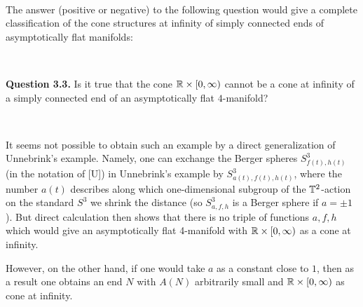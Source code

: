\ 

The answer (positive or negative) to the following question would give
a complete classification
of the cone structures at infinity of simply connected ends
of asymptotically flat manifolds:

\ 

\noindent
{\bf Question 3.3.} Is it true that the cone ${\Bbb R}\times [0,\infty)$ 
cannot be
a cone at infinity of a simply connected end of an
asymptotically flat $4$-manifold?

\ 

It seems not possible to obtain such an 
example by a direct generalization of Unnebrink's example. 
Namely, one can exchange 
the Berger spheres 
$S^3_{f(t),h(t)}$ (in the notation of [U]) 
in Unnebrink's example by $S^3_{a(t),f(t),h(t)}$, 
where the number $a(t)$ describes along which one-dimensional subgroup 
of the ${\Bbb T}^2$-action 
on the standard $S^3$ we shrink the distance 
(so $S^3_{a,f,h}$ is a Berger sphere if $a=\pm1$).
But direct calculation then shows that there is no triple of functions
$a,f,h$ which
would give an asymptotically flat 4-manifold with ${\Bbb R}\times [0,\infty)$
as a cone at infinity.

However, on the other hand, if one would take $a$ as a constant close to $1$, then
as a result one obtains an end $N$ with $A(N)$ arbitrarily small and 
${\Bbb R}\times [0,\infty)$
as cone at infinity.
